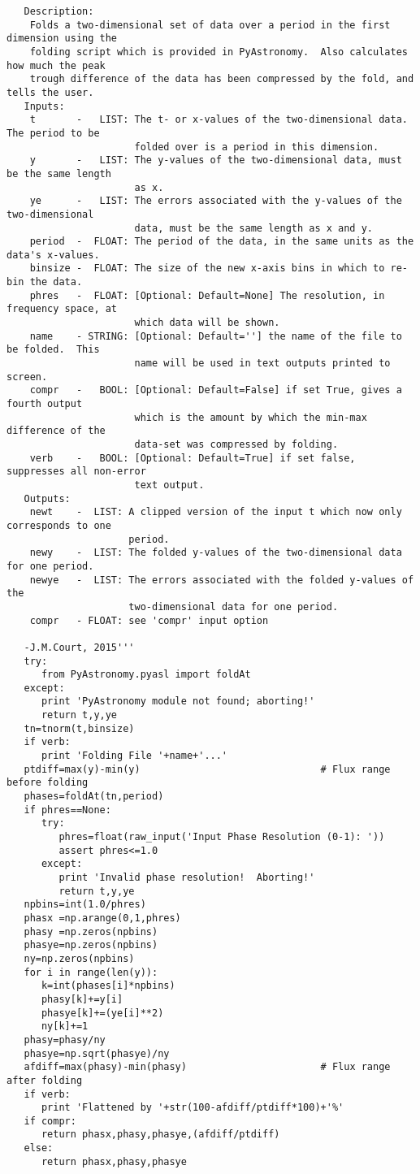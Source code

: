 \begin{verbatim}
   Description:
    Folds a two-dimensional set of data over a period in the first dimension using the
    folding script which is provided in PyAstronomy.  Also calculates how much the peak
    trough difference of the data has been compressed by the fold, and tells the user.
   Inputs:
    t       -   LIST: The t- or x-values of the two-dimensional data.  The period to be
                      folded over is a period in this dimension.
    y       -   LIST: The y-values of the two-dimensional data, must be the same length
                      as x.
    ye      -   LIST: The errors associated with the y-values of the two-dimensional
                      data, must be the same length as x and y.
    period  -  FLOAT: The period of the data, in the same units as the data's x-values.
    binsize -  FLOAT: The size of the new x-axis bins in which to re-bin the data.
    phres   -  FLOAT: [Optional: Default=None] The resolution, in frequency space, at
                      which data will be shown.
    name    - STRING: [Optional: Default=''] the name of the file to be folded.  This
                      name will be used in text outputs printed to screen.
    compr   -   BOOL: [Optional: Default=False] if set True, gives a fourth output
                      which is the amount by which the min-max difference of the
                      data-set was compressed by folding.
    verb    -   BOOL: [Optional: Default=True] if set false, suppresses all non-error
                      text output.
   Outputs:
    newt    -  LIST: A clipped version of the input t which now only corresponds to one
                     period.
    newy    -  LIST: The folded y-values of the two-dimensional data for one period.
    newye   -  LIST: The errors associated with the folded y-values of the
                     two-dimensional data for one period.
    compr   - FLOAT: see 'compr' input option

   -J.M.Court, 2015'''
   try:
      from PyAstronomy.pyasl import foldAt
   except:
      print 'PyAstronomy module not found; aborting!'
      return t,y,ye
   tn=tnorm(t,binsize)
   if verb:
      print 'Folding File '+name+'...'
   ptdiff=max(y)-min(y)                               # Flux range before folding
   phases=foldAt(tn,period)
   if phres==None:
      try:
         phres=float(raw_input('Input Phase Resolution (0-1): '))
         assert phres<=1.0
      except:
         print 'Invalid phase resolution!  Aborting!'
         return t,y,ye
   npbins=int(1.0/phres)
   phasx =np.arange(0,1,phres)
   phasy =np.zeros(npbins)
   phasye=np.zeros(npbins)
   ny=np.zeros(npbins)
   for i in range(len(y)):
      k=int(phases[i]*npbins)
      phasy[k]+=y[i]
      phasye[k]+=(ye[i]**2)
      ny[k]+=1
   phasy=phasy/ny
   phasye=np.sqrt(phasye)/ny
   afdiff=max(phasy)-min(phasy)                       # Flux range after folding
   if verb:
      print 'Flattened by '+str(100-afdiff/ptdiff*100)+'%'
   if compr:
      return phasx,phasy,phasye,(afdiff/ptdiff)
   else:
      return phasx,phasy,phasye


\end{verbatim}
